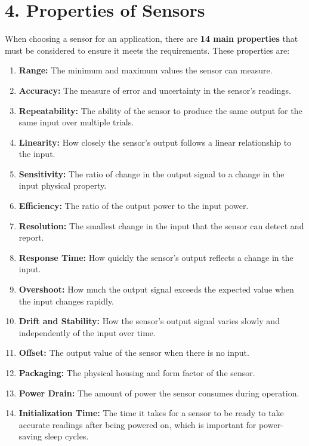 \documentclass[a4paper,12pt]{article}
\begin{document}
\section*{4. Properties of Sensors}

When choosing a sensor for an application, there are \textbf{14 main properties} that must be considered to ensure it meets the requirements. These properties are: 
\begin{enumerate}
    \item \textbf{Range:} The minimum and maximum values the sensor can measure.
    \item \textbf{Accuracy:} The measure of error and uncertainty in the sensor's readings.
    \item \textbf{Repeatability:} The ability of the sensor to produce the same output for the same input over multiple trials.
    \item \textbf{Linearity:} How closely the sensor's output follows a linear relationship to the input.
    \item \textbf{Sensitivity:} The ratio of change in the output signal to a change in the input physical property.
    \item \textbf{Efficiency:} The ratio of the output power to the input power.
    \item \textbf{Resolution:} The smallest change in the input that the sensor can detect and report.
    \item \textbf{Response Time:} How quickly the sensor's output reflects a change in the input.
    \item \textbf{Overshoot:} How much the output signal exceeds the expected value when the input changes rapidly.
    \item \textbf{Drift and Stability:} How the sensor's output signal varies slowly and independently of the input over time.
    \item \textbf{Offset:} The output value of the sensor when there is no input.
    \item \textbf{Packaging:} The physical housing and form factor of the sensor.
    \item \textbf{Power Drain:} The amount of power the sensor consumes during operation.
    \item \textbf{Initialization Time:} The time it takes for a sensor to be ready to take accurate readings after being powered on, which is important for power-saving sleep cycles.
\end{enumerate}
\end{document}
